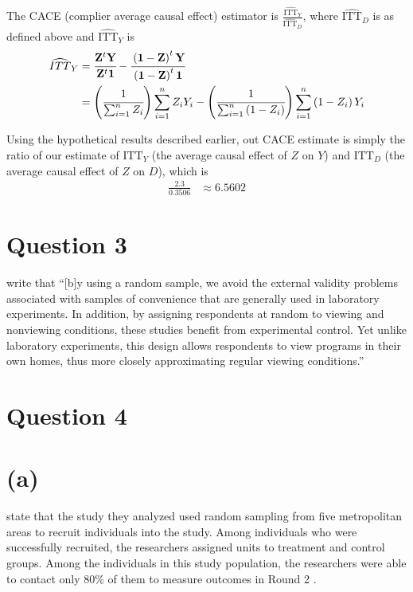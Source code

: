 \documentclass[
  12pt,
  leqno]{article}
\DeclareMathOperator{\1}{\mathbbm{1}}
\begin{document}
The CACE (complier average causal effect) estimator is
\(\frac{\widehat{\text{ITT}}_Y}{\widehat{\text{ITT}}_D}\), where
\(\widehat{\text{ITT}}_D\) is as defined above and
\(\widehat{\text{ITT}}_Y\) is \begin{align*}
\widehat{ITT}_Y & = \cfrac{\mathbf{Z}^{t}\mathbf{Y}}{\mathbf{Z}^{t}\mathbf{1}} - \cfrac{\left(\mathbf{1} - \mathbf{Z}\right)^{t}\mathbf{Y}}{\left(\mathbf{1} - \mathbf{Z}\right)^{t}\mathbf{1}} \\ 
& = \left(\cfrac{1}{\sum_{i = 1}^n Z_i}\right) \sum_{i = 1}^n Z_i Y_i - \left(\cfrac{1}{\sum_{i = 1}^n \left(1 - Z_i\right)}\right) \sum_{i = 1}^n \left(1 - Z_i\right) Y_i
\end{align*}

Using the hypothetical results described earlier, out CACE estimate is
simply the ratio of our estimate of \(\text{ITT}_Y\) (the average causal
effect of \(Z\) on \(Y\)) and \(\text{ITT}_D\) (the average causal
effect of \(Z\) on \(D\)), which is \begin{align*}
\frac{2.3}{0.3506} & \approx 6.5602
\end{align*}

\section*{Question 3}

\citet[276--277]{albertsonlawrence2009} write that ``{[}b{]}y using a
random sample, we avoid the external validity problems associated with
samples of convenience that are generally used in laboratory
experiments. In addition, by assigning respondents at random to viewing
and nonviewing conditions, these studies benefit from experimental
control. Yet unlike laboratory experiments, this design allows
respondents to view programs in their own homes, thus more closely
approximating regular viewing conditions.''

\section*{Question 4}

\section*{(a)}

\citet{albertsonlawrence2009} state that the study they analyzed used
random sampling from five metropolitan areas to recruit individuals into
the study. Among individuals who were successfully recruited, the
researchers assigned units to treatment and control groups. Among the
individuals in this study population, the researchers were able to
contact only 80\% of them to measure outcomes in Round 2
\citep[284]{albertsonlawrence2009}.
\end{document}
